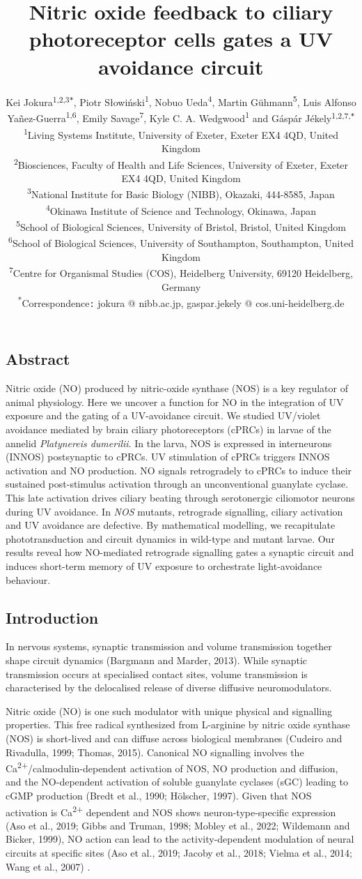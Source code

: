 \documentclass[
  11pt,
  letterpaper,
  DIV=11,
  numbers=noendperiod]{scrartcl}
\title{Nitric oxide feedback to ciliary photoreceptor cells gates a UV
avoidance circuit}
\subtitle{{Kei Jokura\textsuperscript{1,2,3\texttt{*}}, Piotr
Słowiński\textsuperscript{1}, Nobuo Ueda\textsuperscript{4}, Martin
Gühmann\textsuperscript{5}, Luis Alfonso
Yañez-Guerra\textsuperscript{1,6}, Emily Savage\textsuperscript{7}, Kyle
C. A. Wedgwood\textsuperscript{1} and Gáspár
Jékely\textsuperscript{1,2,7,\texttt{*}}}\\
{\textsuperscript{1}Living Systems Institute, University of Exeter,
Exeter EX4 4QD, United Kingdom}\\
{\textsuperscript{2}Biosciences, Faculty of Health and Life Sciences,
University of Exeter, Exeter EX4 4QD, United Kingdom}\\
{\textsuperscript{3}National Institute for Basic Biology (NIBB),
Okazaki, 444-8585, Japan}\\
{\textsuperscript{4}Okinawa Institute of Science and Technology,
Okinawa, Japan}\\
{\textsuperscript{5}School of Biological Sciences, University of
Bristol, Bristol, United Kingdom}\\
{\textsuperscript{6}School of Biological Sciences, University of
Southampton, Southampton, United Kingdom}\\
{\textsuperscript{7}Centre for Organismal Studies (COS), Heidelberg
University, 69120 Heidelberg, Germany}\\
{\textsuperscript{*}Correspondence\texttt{:} jokura @ nibb.ac.jp,
gaspar.jekely @ cos.uni-heidelberg.de}}
\author{}
\date{}
\begin{document}
\maketitle

\linenumbers


\subsection{Abstract}\label{abstract}

Nitric oxide (NO) produced by nitric-oxide synthase (NOS) is a key
regulator of animal physiology. Here we uncover a function for NO in the
integration of UV exposure and the gating of a UV-avoidance circuit. We
studied UV/violet avoidance mediated by brain ciliary photoreceptors
(cPRCs) in larvae of the annelid \emph{Platynereis dumerilii}. In the
larva, NOS is expressed in interneurons (INNOS) postsynaptic to cPRCs.
UV stimulation of cPRCs triggers INNOS activation and NO production. NO
signals retrogradely to cPRCs to induce their sustained post-stimulus
activation through an unconventional guanylate cyclase. This late
activation drives ciliary beating through serotonergic ciliomotor
neurons during UV avoidance. In \emph{NOS} mutants, retrograde
signalling, ciliary activation and UV avoidance are defective. By
mathematical modelling, we recapitulate phototransduction and circuit
dynamics in wild-type and mutant larvae. Our results reveal how
NO-mediated retrograde signalling gates a synaptic circuit and induces
short-term memory of UV exposure to orchestrate light-avoidance
behaviour.

\subsection{Introduction}\label{introduction}

In nervous systems, synaptic transmission and volume transmission
together shape circuit dynamics (Bargmann and Marder, 2013). While
synaptic transmission occurs at specialised contact sites, volume
transmission is characterised by the delocalised release of diverse
diffusive neuromodulators.

Nitric oxide (NO) is one such modulator with unique physical and
signalling properties. This free radical synthesized from L-arginine by
nitric oxide synthase (NOS) is short-lived and can diffuse across
biological membranes (Cudeiro and Rivadulla, 1999; Thomas, 2015).
Canonical NO signalling involves the
Ca\textsuperscript{2+}/calmodulin-dependent activation of NOS, NO
production and diffusion, and the NO-dependent activation of soluble
guanylate cyclases (sGC) leading to cGMP production (Bredt et al., 1990;
Hölscher, 1997). Given that NOS activation is Ca\textsuperscript{2+}
dependent and NOS shows neuron-type-specific expression (Aso et al.,
2019; Gibbs and Truman, 1998; Mobley et al., 2022; Wildemann and Bicker,
1999), NO action can lead to the activity-dependent modulation of neural
circuits at specific sites (Aso et al., 2019; Jacoby et al., 2018;
Vielma et al., 2014; Wang et al., 2007) .
\end{document}

